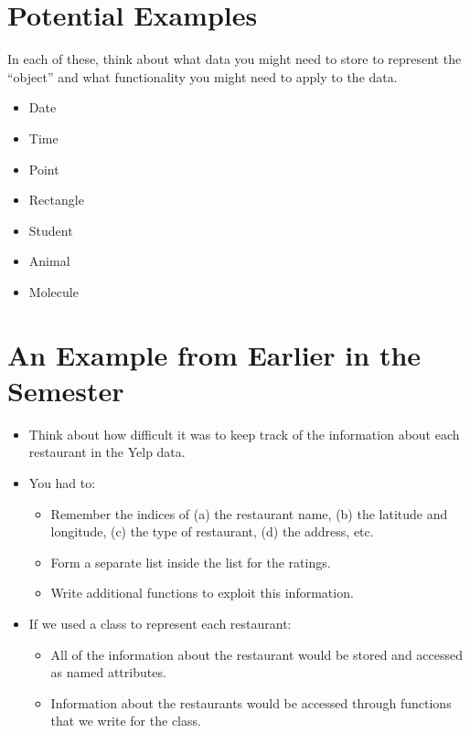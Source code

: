 \documentclass[letterpaper,10pt,english]{sphinxmanual}
\begin{document}
\section{Potential Examples}
\label{\detokenize{lecture_notes/lec18_classes1:potential-examples}}
In each of these, think about what data you might need to store to
represent the “object” and what functionality you might need to apply to
the data.
\begin{itemize}
\item {} 
Date

\item {} 
Time

\item {} 
Point

\item {} 
Rectangle

\item {} 
Student

\item {} 
Animal

\item {} 
Molecule

\end{itemize}


\section{An Example from Earlier in the Semester}
\label{\detokenize{lecture_notes/lec18_classes1:an-example-from-earlier-in-the-semester}}\begin{itemize}
\item {} 
Think about how difficult it was to keep track of the information
about each restaurant in the Yelp data.

\item {} 
You had to:
\begin{itemize}
\item {} 
Remember the indices of (a) the restaurant name, (b) the latitude
and longitude, (c) the type of restaurant, (d) the address, etc.

\item {} 
Form a separate list inside the list for the ratings.

\item {} 
Write additional functions to exploit this information.

\end{itemize}

\item {} 
If we used a class to represent each restaurant:
\begin{itemize}
\item {} 
All of the information about the restaurant would be stored and
accessed as named attributes.

\item {} 
Information about the restaurants would be accessed through
functions that we write for the class.

\end{itemize}

\end{itemize}
\end{document}
